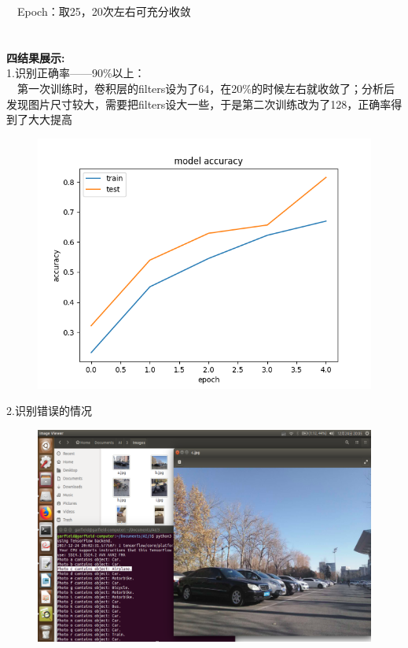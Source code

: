 \documentclass[19pt,a4paper]{article}
\begin{document}
\indent\ \ Epoch：取25，20次左右可充分收敛\\
\\
\\
\indent\textbf{四\quad 结果展示:}\\
\indent 1.识别正确率——90\%以上：\\
\indent\ \ 第一次训练时，卷积层的filters设为了64，在20\%的时候左右就收敛了；分析后发现图片尺寸较大，需要把filters设大一些，于是第二次训练改为了128，正确率得到了大大提高\\
\begin{figure}[H]
 \centering
 \includegraphics[scale=0.5]{acc.png}
\end{figure}
\indent 2.识别错误的情况
\begin{figure}[H]
 \centering
 \includegraphics[scale=0.6]{wrong.png}
\end{figure}
\end{document}
